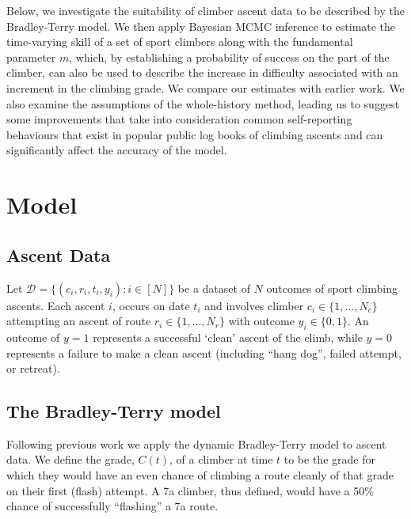 \documentclass{article}
\begin{document}
Below, we investigate the suitability of climber ascent data to be described by the Bradley-Terry model.  We then apply Bayesian MCMC inference to estimate the time-varying skill of a set of sport climbers along with the fundamental parameter $m$, which, by establishing a probability of success on the part of the climber, can also be used to describe the increase in difficulty associated with an increment in the climbing grade.  We compare our estimates with earlier work.  We also examine the assumptions of the whole-history method, leading us to suggest some improvements that take into consideration common self-reporting behaviours that exist in popular public log books of climbing ascents and can significantly affect the accuracy of the model.

\section*{Model}

\subsection*{Ascent Data}

Let $\mathcal{D} = \{(c_i, r_i, t_i, y_i) : i \in [N]\}$ be a dataset of $N$ outcomes of sport climbing ascents.  Each ascent $i$, occurs on date $t_i$ and involves climber $c_i \in \{1,\dots, N_c\}$ attempting an ascent of route $r_i \in \{1,\dots, N_r\}$ with outcome $y_i \in \{0,1\}$. An outcome of $y=1$ represents a successful `clean' ascent of the climb, while $y=0$ represents a failure to make a clean ascent (including ``hang dog'', failed attempt, or retreat). 

\subsection*{The Bradley-Terry model}

Following previous work  \cite{scarff2020estimation} we apply the dynamic Bradley-Terry model \cite{zermelo1929berechnung,bradley1952rank} to ascent data. We define the grade, $C(t)$, of a climber at time $t$ to be the grade for which they would have an even chance of climbing a route cleanly of that grade on their first (\gls{flash}) attempt. A 7a climber, thus defined, would have a 50\% chance of successfully ``flashing'' a 7a route. 
\end{document}
